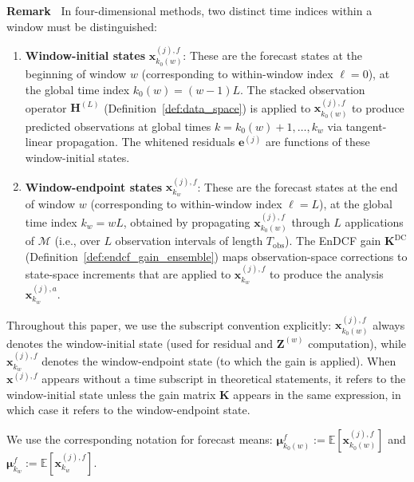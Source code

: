 \documentclass[11pt,a4paper]{article}
\begin{document}
\par\smallskip\noindent{}\textbf{Remark~\theremark}
\label{rem:timing_convention}
In four-dimensional methods, two distinct time indices within a window must be distinguished:
\begin{enumerate}[label=(\roman*),nosep]
\item \textbf{Window-initial states} $\mathbf{x}_{k_0(w)}^{(j),f}$: These are the forecast states at the beginning of window $w$ (corresponding to within-window index $\ell=0$), at the global time index $k_0(w)=(w-1)L$. The stacked observation operator $\mathbf{H}^{(L)}$ (Definition~\ref{def:data_space}) is applied to $\mathbf{x}_{k_0(w)}^{(j),f}$ to produce predicted observations at global times $k=k_0(w)+1,\ldots,k_w$ via tangent-linear propagation. The whitened residuals $\mathbf{e}^{(j)}$ are functions of these window-initial states.
\item \textbf{Window-endpoint states} $\mathbf{x}_{k_w}^{(j),f}$: These are the forecast states at the end of window $w$ (corresponding to within-window index $\ell=L$), at the global time index $k_w=wL$, obtained by propagating $\mathbf{x}_{k_0(w)}^{(j),f}$ through $L$ applications of $\mathcal{M}$ (i.e., over $L$ observation intervals of length $T_{\mathrm{obs}}$). The EnDCF gain $\mathbf{K}^{\mathrm{DC}}$ (Definition~\ref{def:endcf_gain_ensemble}) maps observation-space corrections to state-space increments that are applied to $\mathbf{x}_{k_w}^{(j),f}$ to produce the analysis $\mathbf{x}_{k_w}^{(j),a}$.
\end{enumerate}
Throughout this paper, we use the subscript convention explicitly: $\mathbf{x}_{k_0(w)}^{(j),f}$ always denotes the window-initial state (used for residual and $\mathbf{Z}^{(w)}$ computation), while $\mathbf{x}_{k_w}^{(j),f}$ denotes the window-endpoint state (to which the gain is applied). When $\mathbf{x}^{(j),f}$ appears without a time subscript in theoretical statements, it refers to the window-initial state unless the gain matrix $\mathbf{K}$ appears in the same expression, in which case it refers to the window-endpoint state.
\par\smallskip
\noindent We use the corresponding notation for forecast means: $\boldsymbol{\mu}_{k_0(w)}^{f}:=\mathbb{E}[\mathbf{x}_{k_0(w)}^{(j),f}]$ and $\boldsymbol{\mu}_{k_w}^{f}:=\mathbb{E}[\mathbf{x}_{k_w}^{(j),f}]$.
\par\smallskip
\end{document}
